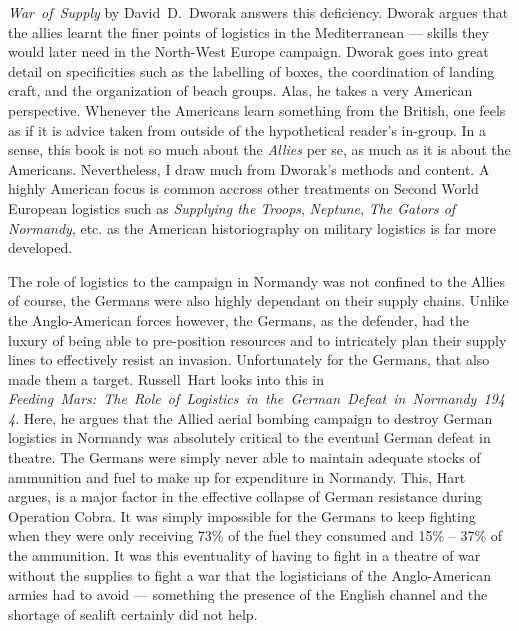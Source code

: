 \documentclass[noraggedright]{turabian-researchpaper}
\begin{document}
\mbox{\textit{War of Supply}} by \mbox{David D. Dworak} answers this 
deficiency.  Dworak argues that the allies learnt the finer points of 
logistics in the Mediterranean --- skills they would later need in the
North-West Europe campaign.\autocite[2]{wos}
Dworak goes into great detail on specificities such as the labelling of
boxes, the coordination of landing craft, and the organization of beach
groups.  Alas, he takes a very American perspective.  Whenever the Americans
learn something from the British, one feels as if it is
advice taken from outside of the hypothetical reader's in-group.  In a sense,
this book is not so much about the \textit{Allies} per se, as much as it is 
about the Americans.  Nevertheless, I draw much from Dworak's methods and 
content.  A highly American focus is common accross other treatments on 
Second World European logistics such as \textit{Supplying the Troops}, 
\textit{Neptune}, \textit{The Gators of Normandy}, etc. %
as the American historiography on military logistics is far more developed.

The role of logistics to the campaign in Normandy was not confined to the
Allies of course, the Germans were also highly dependant on their supply
chains.  Unlike the Anglo-American forces however, the Germans, as the 
defender, 
had the luxury of being able to pre-position resources and to intricately plan
their supply lines to effectively resist an invasion.  Unfortunately for the 
Germans, that also made them a target.  \mbox{Russell Hart} looks into this in 
\mbox{\textit{Feeding Mars:  The Role of Logistics in the German Defeat in
Normandy 1944}}.  Here, he argues that the Allied aerial bombing campaign to 
destroy German logistics in Normandy was absolutely critical to the eventual
German defeat in theatre.\autocite[418, 420]{mars}
The Germans were simply never able to maintain adequate stocks of 
ammunition and fuel to make up for expenditure in Normandy.\autocite[425]
{mars} This, Hart argues, is a major factor in the effective collapse of 
German resistance during Operation Cobra. It was simply impossible for 
the Germans to keep fighting when they were only receiving 73\% of the fuel 
they consumed and 15\% -- 37\% of the ammunition.\autocite[432, 425]{mars} It 
was this eventuality of having to fight in a theatre of war without the 
supplies to fight a war that the logisticians of the Anglo-American armies 
had to avoid --- something the presence of the English channel and the 
shortage of sealift certainly did not help.  
\end{document}
